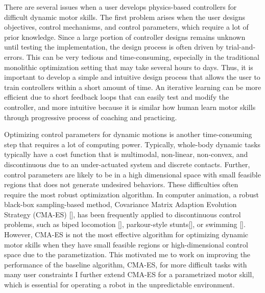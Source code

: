 There are several issues when a user develops physics-based controllers
for difficult dynamic motor skills.
The first problem arises when the user designs objectives, control 
mechanisms, and control parameters, which require a lot of prior knowledge.
Since a large portion of controller designs remains unknown until testing
the implementation, the design process is often driven by trial-and-errors.
This can be very tedious and time-consuming, especially in the traditional
monolithic optimization setting that may take several hours to days.
Thus, it is important to develop a simple and intuitive design process
that allows the user to train controllers within a short amount of time.
An iterative learning can be more efficient due to 
short feedback loops that can easily test and modify the controller,
and more intuitive because it is similar how human learn motor skills
through progressive process of coaching and practicing.

Optimizing control parameters for dynamic motions is another time-consuming
step that requires a lot of computing power.
Typically, whole-body dynamic tasks typically have a cost function
that is multimodal, non-linear, non-convex, and discontinuous due to 
an under-actuated system and discrete contacts.
Further, control parameters are likely to be in a high dimensional
space with small feasible regions that does not generate undesired behaviors.
These difficulties often require the most robust optimization algorithm.
In computer animation, a robust black-box sampling-based method, 
Covariance Matrix Adaption Evolution Strategy (CMA-ES) [], has been frequently
applied to discontinuous control problems, such as biped locomotion [],
parkour-style stunts[], or swimming [].
However, CMA-ES is not the most effective algorithm for
optimizing dynamic motor skills when they have small feasible regions
or high-dimensional control space due to the parametization.
This motivated me to work on improving the performance of the baseline
algorithm, CMA-ES, for more difficult tasks with many user constraints
I further extend CMA-ES for a parametrized motor skill, which is essential
for operating a robot in the unpredictable environment.

